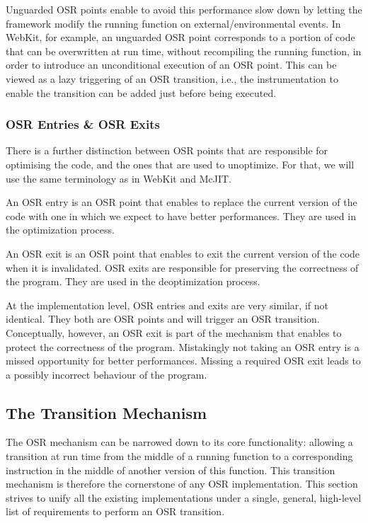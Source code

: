 Unguarded OSR points enable to avoid this performance slow down by letting the framework modify the running function on external/environmental events.
In WebKit\cite{WebKitURL}, for example, an unguarded OSR point corresponds to a portion of code that can be overwritten at run time, without recompiling the running function, in order to introduce an unconditional execution of an OSR point.
This can be viewed as a lazy triggering of an OSR transition, i.e., the instrumentation to enable the transition can be added just before being executed.\\

\subsubsection{OSR Entries \& OSR Exits}

There is a further distinction between OSR points that are responsible for optimising the code, and the ones that are used to unoptimize.
For that, we will use the same terminology as in WebKit\cite{WebKitURL} and McJIT\cite{lameed2013modular}.

\begin{definition}\label{OSREntryDefinition}
An OSR entry is an OSR point that enables to replace the current version of the code with one in which we expect to have better performances.
They are used in the optimization process.
\end{definition}

\begin{definition}
An OSR exit is an OSR point that enables to exit the current version of the code when it is invalidated.
OSR exits are responsible for preserving the correctness of the program.
They are used in the deoptimization process.
\end{definition}

At the implementation level, OSR entries and exits are very similar, if not identical. 
They both are OSR points and will trigger an OSR transition.
Conceptually, however, an OSR exit is part of the mechanism that enables to protect the correctness of the program.
Mistakingly not taking an OSR entry is a missed opportunity for better performances.
Missing a required OSR exit leads to a possibly incorrect behaviour of the program.\\

\subsection{The Transition Mechanism}
The OSR mechanism can be narrowed down to its core functionality: allowing a transition at run time from the middle of a running function to a corresponding instruction in the middle of another version of this function.
This transition mechanism is therefore the cornerstone of any OSR implementation.
This section strives to unify all the existing implementations under a single, general, high-level list of requirements to perform an OSR transition.\\

